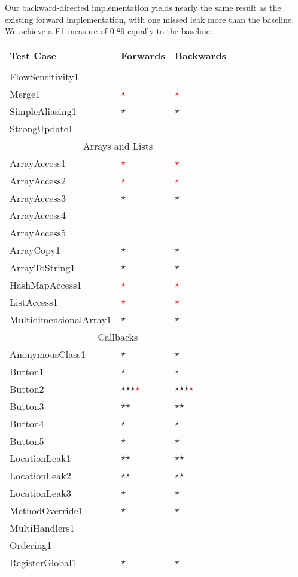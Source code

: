 \documentclass[../draft.tex]{subfiles}
\newcommand{\fp}{{\fontfamily{cmr}\selectfont\textcolor{white}{\textcircled{\textcolor{red}{$\star$}}}}}
\newcommand{\tp}[0]{{\fontfamily{cmr}\selectfont\textcircled{$\star$}}}
\newcommand{\tsub}[1]{\multicolumn{3}{c}{#1}\\\hline}
\begin{document}
    Our backward-directed implementation yields nearly the same result as the existing forward implementation, with one missed leak more than the baseline. We achieve a F1 measure of $0.89$ equally to the baseline.

    \begin{longtable}{l | l | l}
        \textbf{Test Case} & \textbf{Forwards} & \textbf{Backwards}\\
        \hhline
        \endhead %
        \tsub{Aliasing}
        FlowSensitivity1 & &\\
        Merge1 & \fp & \fp\\
        SimpleAliasing1 & \tp & \tp\\
        StrongUpdate1 & &\\
        \hline
        \tsub{Arrays and Lists}
        ArrayAccess1 & \fp & \fp\\
        ArrayAccess2 & \fp & \fp\\
        ArrayAccess3 & \tp & \tp\\
        ArrayAccess4 &  & \\
        ArrayAccess5 &  & \\
        ArrayCopy1 & \tp & \tp\\
        ArrayToString1 & \tp & \tp\\
        HashMapAccess1 & \fp & \fp\\
        ListAccess1 & \fp & \fp\\
        MultidimensionalArray1 & \tp & \tp\\
        \hline
        \tsub{Callbacks}
        AnonymousClass1 & \tp & \tp\\
        Button1 & \tp & \tp \\
        Button2 & \tp \tp \tp \fp & \tp \tp \tp \fp\\
        Button3 & \tp \tp & \tp \tp\\
        Button4 & \tp & \tp\\
        Button5 & \tp & \tp\\
        LocationLeak1 & \tp \tp & \tp \tp\\
        LocationLeak2 & \tp \tp & \tp \tp\\
        LocationLeak3 & \tp & \tp\\
        MethodOverride1 & \tp & \tp\\
        MultiHandlers1 & & \\
        Ordering1 & & \\
        RegisterGlobal1 & \tp & \tp\\

\end{longtable}
\end{document}
